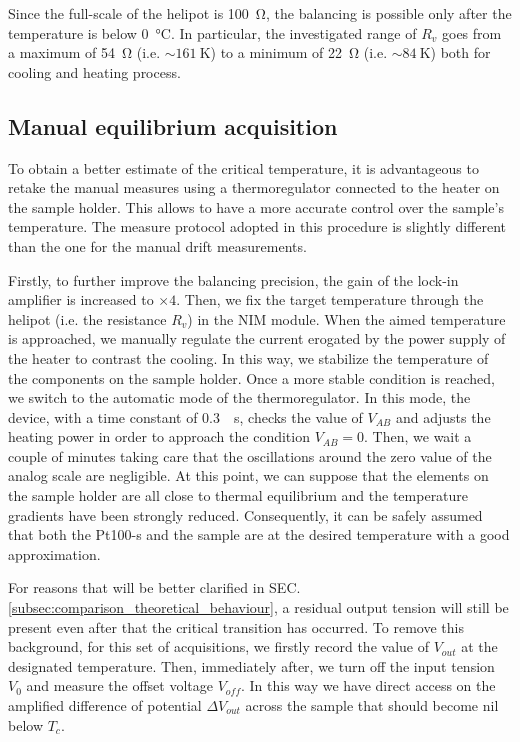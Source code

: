 \documentclass[rmp,10pt,onecolumn,fleqn,notitlepage]{revtex4-1}
\begin{document}
Since the full-scale of the helipot is \SI{100}{\ohm}, the balancing is possible only after the temperature is below \SI{0}{\celsius}. In particular, the investigated range of $R_v$ goes from a maximum of \SI{54}{\ohm} (i.e. $\sim\SI{161}{\kelvin}$) to a minimum of \SI{22}{\ohm} (i.e. $\sim\SI{84}{\kelvin}$) both for cooling and heating process.


\subsection{Manual equilibrium acquisition}
\label{subsec:manual_equilibrium_acquisition}

To obtain a better estimate of the critical temperature, it is advantageous to retake the manual measures using a thermoregulator connected to the heater on the sample holder. This allows to have a more accurate control over the sample's temperature.
The measure protocol adopted in this procedure is slightly different than the one for the manual drift measurements. 

Firstly, to further improve the balancing precision, the gain of the lock-in amplifier is increased to $\times 4$.
Then, we fix the target temperature through the helipot (i.e. the resistance $R_v$) in the NIM module. When the aimed temperature is approached, we manually regulate the current erogated by the power supply of the heater to contrast the cooling. In this way, we stabilize the temperature of the components on the sample holder. Once a more stable condition is reached, we switch to the automatic mode of the thermoregulator. In this mode, the device, with a time constant of \SI{0.3}{\per \s}, checks the value of $V_{AB}$ and adjusts the heating power in order to approach the condition $V_{AB} = 0$. Then, we wait a couple of minutes taking care that the oscillations around the zero value of the analog scale are negligible. At this point, we can suppose that the elements on the sample holder are all close to thermal equilibrium and the temperature gradients have been strongly reduced.
Consequently, it can be safely assumed that both the Pt100-s and the sample are at the desired temperature with a good approximation. 

For reasons that will be better clarified in SEC. \ref{subsec:comparison_theoretical_behaviour}, a residual output tension will still be present even after that the critical transition has occurred. To remove this background, for this set of acquisitions, we firstly record the value of $V_{out}$ at the designated temperature. Then, immediately after, we turn off the input tension $V_0$ and measure the offset voltage $V_{off}$. In this way we have direct access on the amplified difference of potential $\Delta V_{out}$ across the sample that should become nil below $T_c$. 
\end{document}
